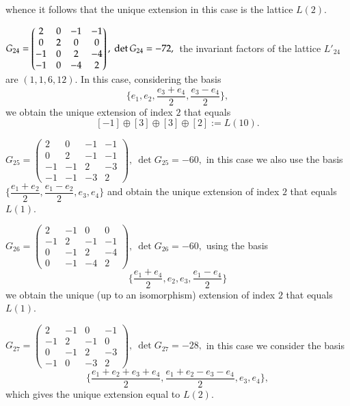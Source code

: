 \documentclass[14pt]{article}
\begin{document}
\begin{small}
whence it follows that the unique extension in this case is the lattice $L(2)$.

\vskip 0.4cm

$
G_{24} =
\begin{pmatrix}
2 & 0 & -1 & -1\\
0 & 2 & 0 & 0\\
-1 & 0 & 2 & -4\\
-1 & 0 & -4 & 2
\end{pmatrix}, \ \det G_{24} = -72, \\
$
the invariant factors of the lattice $L'_{24}$ are $(1, 1, 6, 12)$. In this case,
considering the basis
$$\Big\{e_1, e_2, \dfrac{e_3 + e_4}{2},  \dfrac{e_3 - e_4}{2}\Big\},$$
 we obtain the unique extension of index $2$ that equals
$$[-1] \oplus [3] \oplus [3] \oplus [2]:= L(10).$$
\vskip 0.4cm

$
G_{25} =
\begin{pmatrix}
2 & 0 & -1 & -1\\
0 & 2 & -1 & -1\\
-1 & -1 & 2 & -3\\
-1 & -1 & -3 & 2
\end{pmatrix} , \ \det G_{25} = -60,
$
\vskip 0.4cm
in this case we also use the  basis
$\Big\{\dfrac{e_1 + e_2}{2},  \dfrac{e_1 - e_2}{2},  e_3, e_4\Big\}$ and
obtain the unique extension  of index  $2$ that equals $L(1)$.
\vskip 0.4cm

$
G_{26} =
\begin{pmatrix}
2 & -1 & 0 & 0\\
-1 & 2 & -1 & -1\\
0 & -1 & 2 & -4\\
0 & -1 & -4 & 2
\end{pmatrix} , \ \det G_{26} = -60,
$
\vskip 0.4cm
using the basis
$$\Big\{\dfrac{e_1 + e_4}{2},  e_2, e_3,  \dfrac{e_1 - e_4}{2}\Big\}$$
we obtain the unique (up to an isomorphism) extension of index  $2$ that
equals $L(1)$.
\vskip 0.4cm

$
G_{27} =
\begin{pmatrix}
2 & -1 & 0 & -1\\
-1 & 2 & -1 & 0\\
0 & -1 & 2 & -3\\
-1 & 0 & -3 & 2
\end{pmatrix}, \ \det G_{27} = -28,
$
in this case we consider the basis
$$
\Big\{\dfrac{e_1 + e_2 + e_3 + e_4}{2},  \dfrac{e_1 + e_2 - e_3
- e_4}{2},  e_3, e_4\Big\},
$$
which gives the unique extension  equal to $L(2)$.
\end{small}
\end{document}
